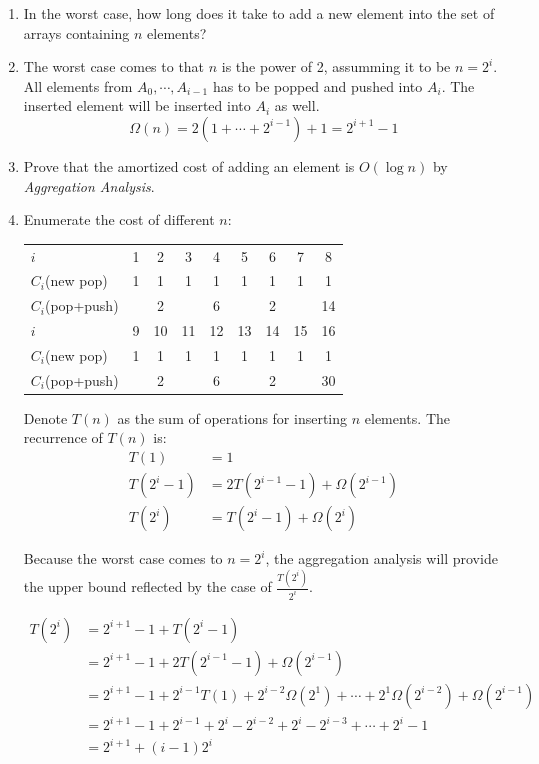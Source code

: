 \documentclass[12pt,a4paper]{article}
\makeatletter
\newtheorem*{solution}{Solution}
\theoremstyle{definition}
\renewenvironment{solution}[1][Solution] {\par\pushQED{\qed}\normalfont\topsep6\p@\@plus6\p@\relax\trivlist\item[\hskip\labelsep\bfseries#1\@addpunct{.}]\ignorespaces}{\popQED\endtrivlist\@endpefalse} \makeatother
\makeatother
\begin{document}
\begin{enumerate}
    \begin{enumerate}
        \item In the worst case, how long does it take to add a new element into the set of arrays containing $n$ elements?
        \begin{solution}
			The worst case comes to that $n$ is the power of 2, assumming it to be $n=2^i$. All elements from $A_0, \cdots, A_{i-1}$ has to be popped and pushed into $A_i$. The inserted element will be inserted into $A_i$ as well.
			\begin{equation*}
				\Omega(n) = 2(1+\cdots + 2^{i-1})+1 = 2^{i+1}-1
			\end{equation*}
		\end{solution}
        \item Prove that the amortized cost of adding an element is $O(\log n)$ by \emph{Aggregation Analysis}.
        \begin{solution}
			Enumerate the cost of different $n$:

			\begin{table}[h]
				\centering
				\begin{tabular}{l|cccccccc}
					\hline
					$i$ 			& 1 & 2 & 3 & 4 & 5 & 6 & 7 & 8 \\
					$C_i$(new pop) 	& 1 & 1 & 1 & 1 & 1 & 1 & 1 & 1 \\
					$C_i$(pop+push)	&   & 2 &   & 6 &   & 2 &   & 14\\
					\hline
					$i$ 			& 9 & 10& 11& 12& 13& 14& 15& 16\\
					$C_i$(new pop) 	& 1 & 1 & 1 & 1 & 1 & 1 & 1 & 1 \\
					$C_i$(pop+push)	&   & 2 &   & 6 &   & 2 &   & 30\\
					\hline
				\end{tabular}
			\end{table}

			Denote $T(n)$ as the sum of operations for inserting $n$ elements. The recurrence of $T(n)$ is:
			\begin{align*}
				T(1) &= 1\\
				T(2^i-1) &= 2T(2^{i-1}-1) + \Omega(2^{i-1})\\
				T(2^i) &= T(2^{i}-1) + \Omega(2^i)
			\end{align*}

			Because the worst case comes to $n=2^i$, the aggregation analysis will provide the upper bound reflected by the case of $\frac{T(2^i)}{2^i}$.

			\begin{align*}
				T(2^i) &= 2^{i+1}-1 + T(2^i-1) \\
					&= 2^{i+1} - 1 + 2T(2^{i-1}-1) + \Omega(2^{i-1})\\
					&= 2^{i+1} - 1 + 2^{i-1}T(1) + 2^{i-2}\Omega(2^1) + \cdots + 2^1\Omega(2^{i-2}) + \Omega(2^{i-1})\\
					&= 2^{i+1} - 1 + 2^{i-1} + 2^i - 2^{i-2} + 2^i - 2^{i-3} + \cdots + 2^i - 1\\
					&= 2^{i+1} +(i-1)2^i
			\end{align*}


\end{solution}
\end{enumerate}
\end{enumerate}
\end{document}
